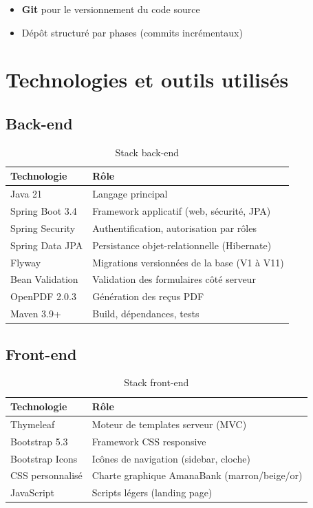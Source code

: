 \begin{itemize}[leftmargin=*]
    \item \textbf{Git} pour le versionnement du code source
    \item Dépôt structuré par phases (commits incrémentaux)
\end{itemize}

\section{Technologies et outils utilisés}

\subsection{Back-end}

\begin{table}[H]
    \centering
    \caption{Stack back-end}
    \label{tab:stack-backend}
    \begin{tabular}{@{}lp{9cm}@{}}
        \toprule
        \textbf{Technologie} & \textbf{Rôle} \\
        \midrule
        Java 21 & Langage principal \\
        Spring Boot 3.4 & Framework applicatif (web, sécurité, JPA) \\
        Spring Security & Authentification, autorisation par rôles \\
        Spring Data JPA & Persistance objet-relationnelle (Hibernate) \\
        Flyway & Migrations versionnées de la base (V1 à V11) \\
        Bean Validation & Validation des formulaires côté serveur \\
        OpenPDF 2.0.3 & Génération des reçus PDF \\
        Maven 3.9+ & Build, dépendances, tests \\
        \bottomrule
    \end{tabular}
\end{table}

\subsection{Front-end}

\begin{table}[H]
    \centering
    \caption{Stack front-end}
    \label{tab:stack-frontend}
    \begin{tabular}{@{}lp{9cm}@{}}
        \toprule
        \textbf{Technologie} & \textbf{Rôle} \\
        \midrule
        Thymeleaf & Moteur de templates serveur (MVC) \\
        Bootstrap 5.3 & Framework CSS responsive \\
        Bootstrap Icons & Icônes de navigation (sidebar, cloche) \\
        CSS personnalisé & Charte graphique AmanaBank (marron/beige/or) \\
        JavaScript & Scripts légers (landing page) \\
        \bottomrule
    \end{tabular}
\end{table}


